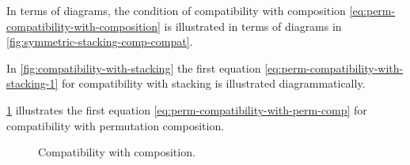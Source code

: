 
In terms of diagrams, the condition of compatibility with composition \cref{eq:perm-compatibility-with-composition} is illustrated in terms of diagrams in \cref{fig:symmetric-stacking-comp-compat}.

\begin{figure*}[h]
    \centering
     \qquad \qquad
    \caption{Compatibility with composition. }
    \label{fig:symmetric-stacking-comp-compat}
\end{figure*}

In \cref{fig:compatibility-with-stacking} the first equation \cref{eq:perm-compatibility-with-stacking-1} for compatibility with stacking is illustrated diagrammatically.

\begin{figure*}[h]
    \centering
     \qquad \qquad
    \caption{Compatibility with composition. }
    \label{fig:compatibility-with-stacking}
\end{figure*}

\cref{fig:compatibility-perm-comp} illustrates the first equation \cref{eq:perm-compatibility-with-perm-comp} for compatibility with permutation composition.

\begin{figure}[h]
    \centering
     \qquad \qquad
    \caption{Compatibility with composition. }
    \label{fig:compatibility-perm-comp}
\end{figure}

